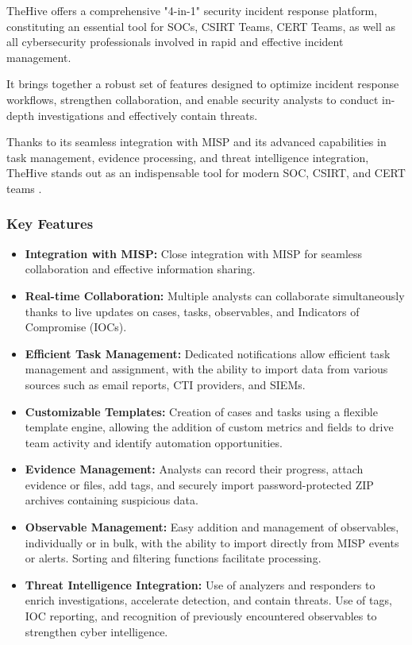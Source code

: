 TheHive offers a comprehensive "4-in-1" security incident response platform, constituting an essential tool for SOCs, CSIRT Teams, CERT Teams, as well as all cybersecurity professionals involved in rapid and effective incident management.

It brings together a robust set of features designed to optimize incident response workflows, strengthen collaboration, and enable security analysts to conduct in-depth investigations and effectively contain threats.

Thanks to its seamless integration with MISP and its advanced capabilities in task management, evidence processing, and threat intelligence integration, TheHive stands out as an indispensable tool for modern SOC, CSIRT, and CERT teams \cite{thehive-docs}.

\subsubsection{Key Features}

\begin{itemize}
    \item \textbf{Integration with MISP:} Close integration with MISP for seamless collaboration and effective information sharing.
    \item \textbf{Real-time Collaboration:} Multiple analysts can collaborate simultaneously thanks to live updates on cases, tasks, observables, and Indicators of Compromise (IOCs).
    \item \textbf{Efficient Task Management:} Dedicated notifications allow efficient task management and assignment, with the ability to import data from various sources such as email reports, CTI providers, and SIEMs.
    \item \textbf{Customizable Templates:} Creation of cases and tasks using a flexible template engine, allowing the addition of custom metrics and fields to drive team activity and identify automation opportunities.
    \item \textbf{Evidence Management:} Analysts can record their progress, attach evidence or files, add tags, and securely import password-protected ZIP archives containing suspicious data.
    \item \textbf{Observable Management:} Easy addition and management of observables, individually or in bulk, with the ability to import directly from MISP events or alerts. Sorting and filtering functions facilitate processing.
    \item \textbf{Threat Intelligence Integration:} Use of analyzers and responders to enrich investigations, accelerate detection, and contain threats. Use of tags, IOC reporting, and recognition of previously encountered observables to strengthen cyber intelligence.
\end{itemize}

